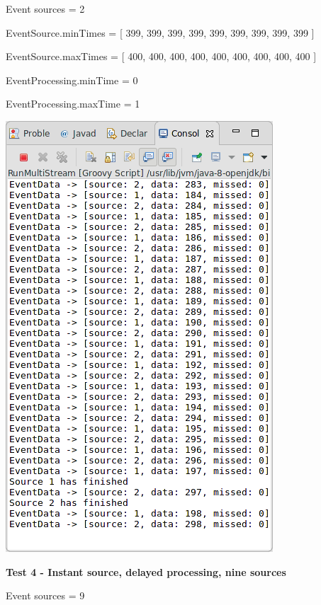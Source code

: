 Event sources = 2

EventSource.minTimes = [ 399, 399, 399, 399, 399, 399, 399, 399, 399 ]

EventSource.maxTimes = [ 400, 400, 400, 400, 400, 400, 400, 400, 400 ]

EventProcessing.minTime = 0

EventProcessing.maxTime = 1

\includegraphics[width=\textwidth/2]{img/screenshots/9-2-3.png}

\textbf{Test 4 - Instant source, delayed processing, nine sources}

Event sources = 9

